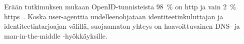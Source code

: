 \documentclass[finnish,gradu]{tktltiki}
\begin{document}
  Erään tutkimuksen mukaan OpenID-tunnisteista 98~\% on http ja vain 2~\% https~\cite{openid_identifier_survey_2011}.
  Koska user-agenttia uudelleenohjataan identiteetinkuluttajan ja identiteetintarjoajan välillä, suojaamaton yhteys on haavoittuvainen DNS- ja man-in-the-middle -hyökkäyksille.








\end{document}
